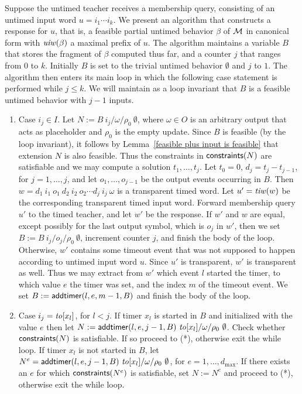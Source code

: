 Suppose the untimed teacher receives a membership query, consisting of an untimed input word $u = i_1 \cdots i_k$.
We present an algorithm that constructs a response for $u$, that is, a feasible partial untimed behavior 
$\beta$ of ${\mathcal M}$ in canonical form with $\mathit{uiw}(\beta)$ a maximal prefix of $u$.
The algorithm maintains a variable $B$ that stores the fragment of $\beta$ computed thus far, and a counter $j$ that ranges from $0$ to $k$.
Initially $B$ is set to the trivial untimed behavior $\emptyset$ and $j$ to $1$.
The algorithm then enters its main loop in which the following case statement is performed while $j \leq k$.  
We will maintain as a loop invariant that $B$ is a feasible untimed behavior with $j-1$ inputs.
\begin{enumerate}
\item
Case $i_j \in I$. Let $N := B ~ i_j/\omega/\rho_0 ~ \emptyset$, where $\omega \in O$ is an arbitrary output that acts as placeholder
and $\rho_0$ is the empty update.
Since $B$ is feasible (by the loop invariant), it follows by Lemma~\ref{feasible plus input is feasible} that
extension $N$ is also feasible.
Thus the constraints in $\mathsf{constraints}({N})$ are satisfiable and we may compute a solution $t_1 ,\ldots, t_j$.
Let $t_0 = 0$, $d_j = t_j - t_{j-1}$, for $j = 1,\ldots, j$, and let
$o_1 ,\ldots, o_{j-1}$ be the output events occurring in $B$. 
Then $w = d_1 ~ i_1 ~ o_1 ~ d_2 ~ i_2 ~ o_2 \cdots d_j ~ i_j ~ \omega$ is a transparent timed word.
Let $u' = \mathit{tiw}(w)$ be the corresponding transparent timed input word.
Forward membership query $u'$ to the timed teacher, and
let $w'$ be the response.
If $w'$ and $w$ are equal, except possibly for the last output symbol, which is $o_j$ in $w'$,
then we set  $B := B ~ i_j/o_j/\rho_0 ~ \emptyset$, increment counter $j$, and finish the body of the loop.
Otherwise, $w'$ contains some timeout event that was not supposed to happen according to untimed input word $u$.
Since $u'$ is transparent, $w'$ is transparent as well. 
Thus we may extract from $w'$ which event $l$ started the timer, to which value
$e$ the timer was set, and the index $m$ of the timeout event.
We set $B := \mathsf{addtimer}({l,e,m-1,B})$ and finish the body of the loop. 
\item
Case $i_j = \mathit{to}[x_l]$, for $l < j$.
If timer $x_l$ is started in $B$ and initialized with the value $e$ then
let $N := \mathsf{addtimer}({l,e,j-1,B}) ~ \mathit{to}[x_l]/\omega/\rho_0 ~ \emptyset$.
Check whether $\mathsf{constraints}({N})$ is satisfiable. If so proceed to (*), otherwise exit the while loop.
If timer $x_l$ is not started in $B$, let
$N^e = \mathsf{addtimer}({l,e,j-1,B}) ~ \mathit{to}[x_l]/\omega/\rho_0 ~ \emptyset$, for $e = 1 ,\ldots, d_{\max}$.
If there exists an $e$ for which $\mathsf{constraints}({N^e})$ is satisfiable, set $N := N^e$ and proceed to (*),
otherwise exit the while loop.


\end{enumerate}
